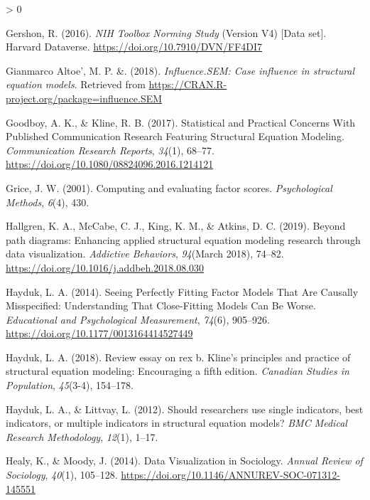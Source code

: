 \documentclass[
  english,
  man]{apa6}
\newlength{\cslhangindent}
\newenvironment{CSLReferences}[2] %
 {%
  \setlength{\parindent}{0pt}
  \ifodd #1 \everypar{\setlength{\hangindent}{\cslhangindent}}\ignorespaces\fi
  \ifnum #2 > 0
  \setlength{\parskip}{#2\baselineskip}
  \fi
 }%
 {}
\begin{document}
\begin{CSLReferences}{1}{0}
\leavevmode\hypertarget{ref-toolboxData}{}%
Gershon, R. (2016). \emph{{NIH Toolbox Norming Study}} (Version V4) {[}Data set{]}. Harvard Dataverse. \url{https://doi.org/10.7910/DVN/FF4DI7}

\leavevmode\hypertarget{ref-influenceSEM}{}%
Gianmarco Altoe', M. P. \&. (2018). \emph{Influence.SEM: Case influence in structural equation models}. Retrieved from \url{https://CRAN.R-project.org/package=influence.SEM}

\leavevmode\hypertarget{ref-Goodboy2017}{}%
Goodboy, A. K., \& Kline, R. B. (2017). {Statistical and Practical Concerns With Published Communication Research Featuring Structural Equation Modeling}. \emph{Communication Research Reports}, \emph{34}(1), 68--77. \url{https://doi.org/10.1080/08824096.2016.1214121}

\leavevmode\hypertarget{ref-grice2001computing}{}%
Grice, J. W. (2001). Computing and evaluating factor scores. \emph{Psychological Methods}, \emph{6}(4), 430.

\leavevmode\hypertarget{ref-Hallgren2019a}{}%
Hallgren, K. A., McCabe, C. J., King, K. M., \& Atkins, D. C. (2019). {Beyond path diagrams: Enhancing applied structural equation modeling research through data visualization}. \emph{Addictive Behaviors}, \emph{94}(March 2018), 74--82. \url{https://doi.org/10.1016/j.addbeh.2018.08.030}

\leavevmode\hypertarget{ref-Hayduk2014}{}%
Hayduk, L. A. (2014). {Seeing Perfectly Fitting Factor Models That Are Causally Misspecified: Understanding That Close-Fitting Models Can Be Worse}. \emph{Educational and Psychological Measurement}, \emph{74}(6), 905--926. \url{https://doi.org/10.1177/0013164414527449}

\leavevmode\hypertarget{ref-hayduk2018review}{}%
Hayduk, L. A. (2018). Review essay on rex b. Kline's principles and practice of structural equation modeling: Encouraging a fifth edition. \emph{Canadian Studies in Population}, \emph{45}(3-4), 154--178.

\leavevmode\hypertarget{ref-hayduk2012should}{}%
Hayduk, L. A., \& Littvay, L. (2012). Should researchers use single indicators, best indicators, or multiple indicators in structural equation models? \emph{BMC Medical Research Methodology}, \emph{12}(1), 1--17.

\leavevmode\hypertarget{ref-Healy2014a}{}%
Healy, K., \& Moody, J. (2014). {Data Visualization in Sociology}. \emph{Annual Review of Sociology}, \emph{40}(1), 105--128. \url{https://doi.org/10.1146/ANNUREV-SOC-071312-145551}


\end{CSLReferences}
\end{document}
